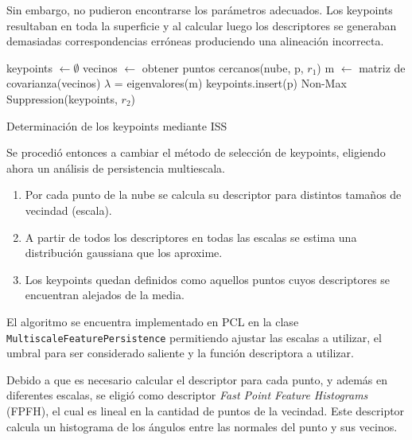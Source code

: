 			Sin embargo, no pudieron encontrarse los parámetros adecuados.
			Los keypoints resultaban en toda la superficie y al calcular luego
			los descriptores se generaban demasiadas correspondencias erróneas
			produciendo una alineación incorrecta.

			\begin{algorithm}
				\begin{algorithmic}[1]
						\State keypoints $\gets\emptyset$
							\State vecinos $\gets$ obtener puntos cercanos(nube, p, $r_1$)
							\State m $\gets$ matriz de covarianza(vecinos)
							\State $\lambda$ = eigenvalores(m)
								\State keypoints.insert(p)
							\EndIf
						\EndFor
						\State\Return Non-Max Suppression(keypoints, $r_2$)
					\EndFunction
				\end{algorithmic}
				\caption{\label{alg:iss}Determinación de los keypoints mediante ISS}
			\end{algorithm}


			Se procedió entonces a cambiar el método de selección de keypoints, eligiendo ahora un análisis de persistencia multiescala.
			\begin{enumerate}
				\item Por cada punto de la nube se calcula su descriptor para distintos tamaños de vecindad (escala).
				\item A partir de todos los descriptores en todas las escalas se estima una distribución gaussiana que los aproxime.
				\item Los keypoints quedan definidos como aquellos puntos cuyos descriptores se encuentran alejados de la media.
			\end{enumerate}
			El algoritmo se encuentra implementado en PCL en la clase
			\texttt{Multiscale\-Feature\-Persistence} permitiendo ajustar las
			escalas a utilizar, el umbral para ser considerado saliente y la
			función descriptora a utilizar.

			Debido a que es necesario calcular el descriptor para cada punto, y además en diferentes escalas, se eligió como descriptor 
			\emph{Fast Point Feature Histograms} (FPFH), el cual es lineal en la cantidad de puntos de la vecindad.
			Este descriptor calcula un histograma de los ángulos entre las normales del punto y sus vecinos. %

